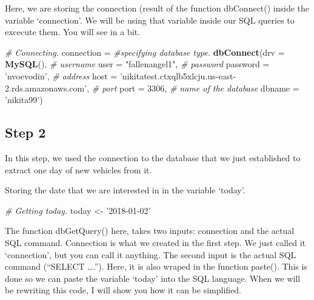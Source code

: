 \documentclass[]{book}
\newenvironment{Shaded}{\begin{snugshade}}{\end{snugshade}}
\newcommand{\CommentTok}[1]{\textcolor[rgb]{0.56,0.35,0.01}{\textit{#1}}}
\newcommand{\DataTypeTok}[1]{\textcolor[rgb]{0.13,0.29,0.53}{#1}}
\newcommand{\DecValTok}[1]{\textcolor[rgb]{0.00,0.00,0.81}{#1}}
\newcommand{\KeywordTok}[1]{\textcolor[rgb]{0.13,0.29,0.53}{\textbf{#1}}}
\newcommand{\NormalTok}[1]{#1}
\newcommand{\StringTok}[1]{\textcolor[rgb]{0.31,0.60,0.02}{#1}}
\begin{document}
Here, we are storing the connection (result of the function dbConnect() inside the variable `connection'. We will be using that variable inside our SQL queries to excecute them. You will see in a bit.

\begin{Shaded}
\begin{Highlighting}[]
\CommentTok{# Connecting.}
\NormalTok{connection =}\StringTok{ }
\CommentTok{#specifying database type. }
\StringTok{  }\KeywordTok{dbConnect}\NormalTok{(}\DataTypeTok{drv =} \KeywordTok{MySQL}\NormalTok{(), }
\CommentTok{# username}
            \DataTypeTok{user =} \StringTok{"fallenangel1"}\NormalTok{, }
\CommentTok{# password}
            \DataTypeTok{password =} \StringTok{'nvoevodin'}\NormalTok{, }
\CommentTok{# address}
            \DataTypeTok{host =} \StringTok{'nikitatest.ctxqlb5xlcju.us-east-2.rds.amazonaws.com'}\NormalTok{, }
\CommentTok{# port}
            \DataTypeTok{port =} \DecValTok{3306}\NormalTok{, }
\CommentTok{# name of the database}
            \DataTypeTok{dbname =} \StringTok{'nikita99'}\NormalTok{) }
\end{Highlighting}
\end{Shaded}

\hypertarget{step-2-1}{%
\subsection{Step 2}\label{step-2-1}}

In this step, we used the connection to the database that we just established to extract one day of new vehicles from it.

Storing the date that we are interested in in the variable `today'.

\begin{Shaded}
\begin{Highlighting}[]
\CommentTok{# Getting today.}
\NormalTok{today <-}\StringTok{ '2018-01-02'}
\end{Highlighting}
\end{Shaded}

The function dbGetQuery() here, takes two inputs: connection and the actual SQL command. Connection is what we created in the first step. We just called it `connection', but you can call it anything. The second input is the actual SQL command (``SELECT \ldots{}.''). Here, it is also wraped in the function paste(). This is done so we can paste the variable `today' into the SQL language. When we will be rewriting this code, I will show you how it can be simplified.
\end{document}
